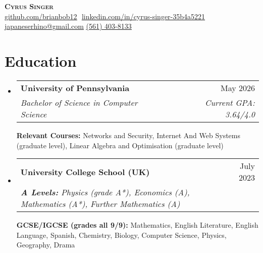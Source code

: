 \documentclass[letterpaper,11pt]{article}
\makeatletter
\newcommand{\resumeSubheading}[4]{
  \vspace{-2pt}\item
    \begin{tabular*}{0.97\textwidth}[t]{l@{\extracolsep{\fill}}r}
      \textbf{#1} & #2 \\
      \textit{\small#3} & \textit{\small #4} \\
    \end{tabular*}\vspace{-7pt}
}
\newcommand{\resumeSubHeadingListStart}{\begin{itemize}[leftmargin=0.15in, label={}]}
\newcommand{\resumeSubHeadingListEnd}{\end{itemize}}
\makeatother
\begin{document}
\hfill

\begin{center}
    \textbf{\Huge \scshape Cyrus Singer} \\ \vspace{8pt}
    \small 
    \href{https://github.com/brianbob12}{\underline{github.com/brianbob12}} $  $
    \href{https://www.linkedin.com/in/cyrus-singer-35b4a5221}{\underline{linkedin.com/in/cyrus-singer-35b4a5221}} $  $
    \href{mailto:japaneserhino@gmail.com}
    {\underline{japaneserhino@gmail.com}}
    \href{tel:561-403-8133}{\underline{(561) 403-8133}}
\end{center}

\section{Education}
  \resumeSubHeadingListStart
  
    \resumeSubheading
      {University of Pennsylvania}{May 2026}
      {Bachelor of Science in Computer Science}{Current GPA: 3.64/4.0}
      
      \vspace{5pt}

      \textbf{Relevant Courses:} \small{Networks and Security, Internet And Web Systems (graduate level), Linear Algebra and Optimisation (graduate level)}\\

    \resumeSubheading
      {University College School \footnotesize{(UK)}}{July 2023} 
      {\textbf{A Levels:} \footnotesize{Physics (grade A*), Economics (A), Mathematics (A*), Further Mathematics (A)}}{}
      \newline
      \newline
      {\textbf{GCSE/IGCSE (grades all 9/9):} \footnotesize{Mathematics, English Literature, English Language, Spanish, Chemistry, Biology, Computer Science, Physics, Geography, Drama }}{}



  \resumeSubHeadingListEnd

\end{document}
